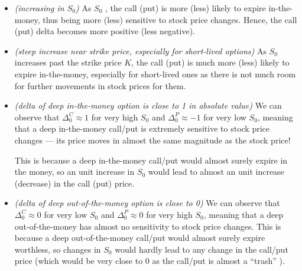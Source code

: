 \begin{enumerate}
\begin{itemize}
\item \emph{(increasing in \(S_0\))} As \(S_0\) , the call
(put) is more (less) likely to expire in-the-money, thus being more (less)
sensitive to stock price changes. Hence, the call (put) delta becomes more
positive (less negative).

\item \emph{(steep increase near strike price, especially for short-lived
options)} As \(S_0\) increases past the strike price \(K\), the call (put) is
much more (less) likely to expire in-the-money, especially for short-lived ones
as there is not much room for further movements in stock prices for them.

\item \emph{(delta of deep in-the-money option is close to 1 in absolute
value)} We can observe that \(\Delta_0^C\approx 1\) for very high \(S_0\) and
\(\Delta_0^{P}\approx -1\) for very low \(S_0\), meaning that a deep
in-the-money call/put is extremely sensitive to stock price changes --- its
price moves in almost the same magnitude as the stock price!

This is because a deep in-the-money call/put would almost surely expire in the
money, so an unit increase in \(S_0\) would lead to almost an unit increase
(decrease) in the call (put) price.

\item \emph{(delta of deep out-of-the-money option is close to 0)} We can
observe that \(\Delta_0^C\approx 0\) for very low \(S_0\) and
\(\Delta_0^{P}\approx 0\) for very high \(S_0\), meaning that a deep
out-of-the-money has almost no sensitivity to stock price changes. This is
because a deep out-of-the-money call/put would almost surely expire worthless,
so changes in \(S_0\) would hardly lead to any change in the call/put price
(which would be very close to 0 as the call/put is almost a ``trash''
).


\end{itemize}
\end{enumerate}
